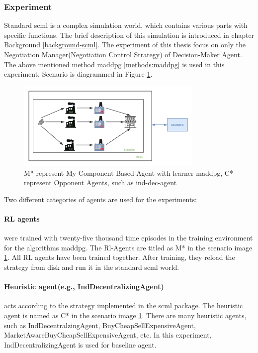 \subsubsection{Experiment}
Standard \gls{scml} is a complex simulation world, which contains various parts with specific functions. The brief description of this simulation is introduced in chapter Background \ref{background-scml}. The experiment of this thesis focus on only the Negotiation Manager(Negotiation Control Strategy) of Decision-Maker Agent. The above mentioned method maddpg \ref{methods:maddpg} is used in this experiment. 
Scenario is diagrammed in Figure \ref{fig:scenario-standard-scml}.

\begin{figure}[htbp]
\centering
\includegraphics[width=0.80\textwidth]{./images/scenario-standard-scml.png}
\caption{M* represent My Component Based Agent with learner \gls{maddpg}, C* represent Opponent Agents, such as \gls{ind-dec-agent}}
\label{fig:scenario-standard-scml}
\end{figure}

Two different categories of agents are used for the experiments:
\paragraph{RL agents} were trained with twenty-five thousand time episodes in the training environment for the algorithms maddpg. The Rl-Agents are titled as M* in the scenario image \ref{fig:scenario-standard-scml}. All RL agents have been trained together. After training, they reload the strategy from disk and run it in the standard scml world.

\paragraph{Heuristic agent(e.g., IndDecentralizingAgent)} acts according to the strategy implemented in the scml package. The heuristic agent is named as C* in the scenario image \ref{fig:scenario-standard-scml}. There are many heuristic agents, such as IndDecentralzingAgent, BuyCheapSellExpensiveAgent, MarketAwareBuyCheapSellExpensiveAgent, etc. In this experiment, IndDecentralizingAgent is used for baseline agent.

